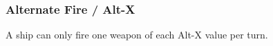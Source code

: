 \subsubsection{Alternate Fire / Alt-X}
A ship can only fire one weapon of each Alt-X value per turn.